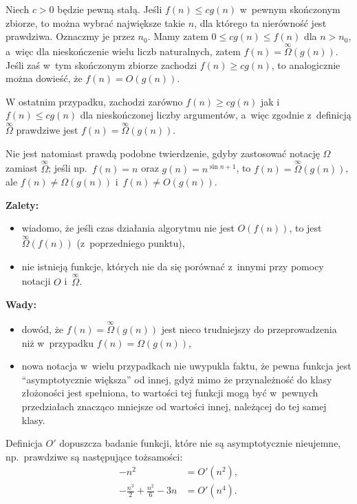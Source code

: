 
\subproblem %
Niech $c>0$ będzie pewną stałą. Jeśli $f(n)\le cg(n)$ w~pewnym skończonym zbiorze, to można wybrać największe takie $n$, dla którego ta nierówność jest prawdziwa. Oznaczmy je przez $n_0$. Mamy zatem $0\le cg(n)\le f(n)$ dla $n>n_0$, a~więc dla nieskończenie wielu liczb naturalnych, zatem $f(n)=\overset{\infty}{\Omega}(g(n))$. Jeśli zaś w~tym skończonym zbiorze zachodzi $f(n)\ge cg(n)$, to analogicznie można dowieść, że $f(n)=O(g(n))$.

W ostatnim przypadku, zachodzi zarówno $f(n)\ge cg(n)$ jak i~$f(n)\le cg(n)$ dla nieskończonej liczby argumentów, a~więc zgodnie z~definicją $\overset{\infty}{\Omega}$ prawdziwe jest $f(n)=\overset{\infty}{\Omega}(g(n))$.

Nie jest natomiast prawdą podobne twierdzenie, gdyby zastosować notację $\Omega$ zamiast $\overset{\infty}{\Omega}$; jeśli np.\ $f(n)=n$ oraz $g(n)=n^{\sin n+1}$, to $f(n)=\overset{\infty}{\Omega}(g(n))$, ale $f(n)\ne\Omega(g(n))$ i~$f(n)\ne O(g(n))$.

\subproblem %
\textbf{Zalety:}
\begin{itemize}
	\item wiadomo, że jeśli czas działania algorytmu nie jest $O(f(n))$, to jest $\overset{\infty}{\Omega}(f(n))$ (z~poprzedniego punktu),
	\item nie istnieją funkcje, których nie da się porównać z~innymi przy pomocy notacji $O$ i~$\overset{\infty}{\Omega}$.
\end{itemize}
\textbf{Wady:}
\begin{itemize}
	\item dowód, że $f(n)=\overset{\infty}{\Omega}(g(n))$ jest nieco trudniejszy do przeprowadzenia niż w~przypadku $f(n)=\Omega(g(n))$,
	\item nowa notacja w~wielu przypadkach nie uwypukla faktu, że pewna funkcja jest ``asymptotycznie większa'' od innej, gdyż mimo że przynależność do klasy złożoności jest spełniona, to wartości tej funkcji mogą być w~pewnych przedziałach znacząco mniejsze od wartości innej, należącej do tej samej klasy.
\end{itemize}

\subproblem %
Definicja $O'$ dopuszcza badanie funkcji, które nie są asymptotycznie nieujemne, np.\ prawdziwe są następujące tożsamości:
\begin{align*}
	-n^2 &= O'(n^2), \\
	-\frac{n^3}{2}+\frac{n^2}{6}-3n &= O'(n^4).
\end{align*}

